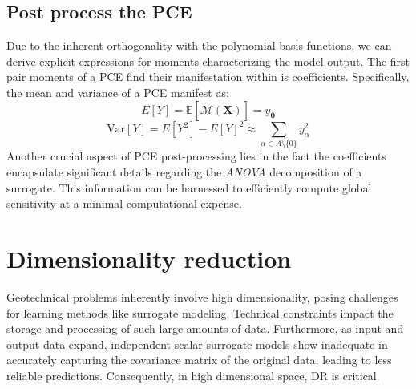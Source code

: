 \subsection{Post process the \acrshort{PCE}}
Due to the inherent orthogonality with the polynomial basis functions, we can derive explicit expressions for moments characterizing the model output. The first pair moments of a \acrshort{PCE} find their manifestation within is coefficients. Specifically, the mean and variance of a \acrshort{PCE} manifest as:
\begin{equation}
E[Y] = \mathbb{E}[\tilde{\mathcal{M}}(\boldsymbol{X})] = y_{\boldsymbol{0}}
\end{equation}
\begin{equation}
\text{Var}[Y] = E[Y^2] - E[Y]^2  \approx \sum_{\alpha \in A \setminus \{0\}} y_{\alpha}^2
\end{equation}
Another crucial aspect of \acrshort{PCE} post-processing lies in the fact the coefficients encapsulate significant details regarding the \textit{ANOVA} decomposition of a surrogate. This information can be harnessed to efficiently compute global sensitivity at a minimal computational expense. 

\section{Dimensionality reduction}


Geotechnical problems inherently involve high dimensionality, posing challenges for learning methods like surrogate modeling. Technical constraints impact the storage and processing of such large amounts of data. Furthermore, as input and output data expand, independent scalar surrogate models show inadequate in accurately capturing the covariance matrix of the original data, leading to less reliable predictions. Consequently, in high dimensional space, \acrfull{DR} is critical. 

